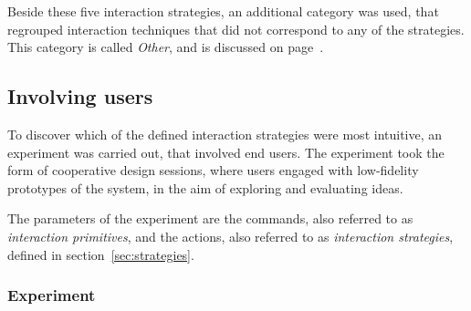 Beside these five interaction strategies, an additional category was used, that regrouped interaction techniques that did not correspond to any of the strategies.
This category is called \emph{Other}, and is discussed on page~\pageref{other}.


\subsection{Involving users}

To discover which of the defined interaction strategies were most intuitive, an experiment was carried out, that involved end users.
The experiment took the form of cooperative design sessions, where users engaged with low-fidelity prototypes of the system, in the aim of exploring and evaluating ideas.

The parameters of the experiment are the commands, also referred to as \emph{interaction primitives}, and the actions, also referred to as \emph{interaction strategies}, defined in section~\ref{sec:strategies}.


\subsubsection{Experiment}

